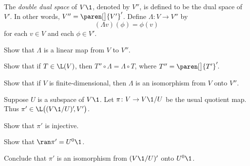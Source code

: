 \pagebreak[3]

\exercise
The \emph{double dual space} of $V\1$, denoted by $V''\!$, is defined to be the dual space of~$V'\!$. In other words,
$V'' = {\paren[\big]{V'}}'$\!. Define $\Lambda \colon V \to V''$ by
\[
(\Lambda v)(\phi) = \phi(v)
\]
for each $v \in V$ and each $\phi \in V'\!$.
\begin{subtheorem}
\item
Show that $\Lambda$ is a linear map from $V$ to $V''\!$.
\item
Show that if $T \in \L(V)$, then $T'' \circ \Lambda = \Lambda \circ T$, where $T'' = {\paren[\big]{T'}}'\!$.
\item
Show that if $V$ is finite-dimensional, then $\Lambda$ is an isomorphism from $V$ onto $V''\!$.
\end{subtheorem}

\exercise
Suppose $U$ is a subspace of $V\1$. Let $\pi \colon V \to V\1/U$ be the usual quotient map. Thus $\pi' \in \L\bigl((V\1/U)'\!, V'\bigr)$.
\begin{subtheorem}
\item
Show that $\pi'$ is injective.
\item
Show that $\ran \pi' = U^0\1$.
\item
Conclude that $\pi'$ is an isomorphism from $(V\1/U)'$ onto $U^0\1$.
\end{subtheorem}


